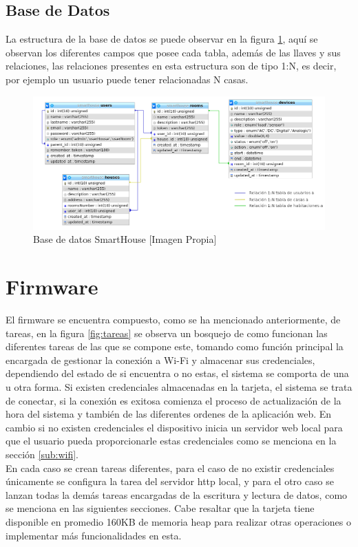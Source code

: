 \subsection{Base de Datos}

La estructura de la base de datos se puede observar en la figura \ref{fig:db}, aquí se observan los diferentes campos que posee cada tabla, además de las llaves y sus relaciones, las relaciones presentes en esta estructura son de tipo 1:N, es decir, por ejemplo un usuario puede tener relacionadas N casas.

\begin{figure}[H]
\centering
\caption{Base de datos SmartHouse [Imagen Propia]}
\label{fig:db}
\includegraphics[width=0.7\linewidth]{Imagenes/DB}
\end{figure}

\section{Firmware}

El firmware se encuentra compuesto, como se ha mencionado anteriormente, de tareas, en la figura \ref{fig:tareas} se observa un bosquejo de como funcionan las diferentes tareas de las que se compone este, tomando como función principal la encargada de gestionar la conexión a Wi-Fi y almacenar sus credenciales, dependiendo del estado de si encuentra o no estas, el sistema se comporta de una u otra forma. Si existen credenciales almacenadas en la tarjeta, el sistema se trata de conectar, si la conexión es exitosa comienza el proceso de actualización de la hora del sistema y también de las diferentes ordenes de la aplicación web. En cambio si no existen credenciales el dispositivo inicia un servidor web local para que el usuario pueda proporcionarle estas credenciales como se menciona en la sección \ref{sub:wifi}.\\

En cada caso se crean tareas diferentes, para el caso de no existir credenciales únicamente se configura la tarea del servidor http local, y para el otro caso se lanzan todas la demás tareas encargadas de la escritura y lectura de datos, como se menciona en las siguientes secciones. Cabe resaltar que la tarjeta tiene disponible en promedio 160KB de memoria heap para realizar otras operaciones o implementar más funcionalidades en esta.

